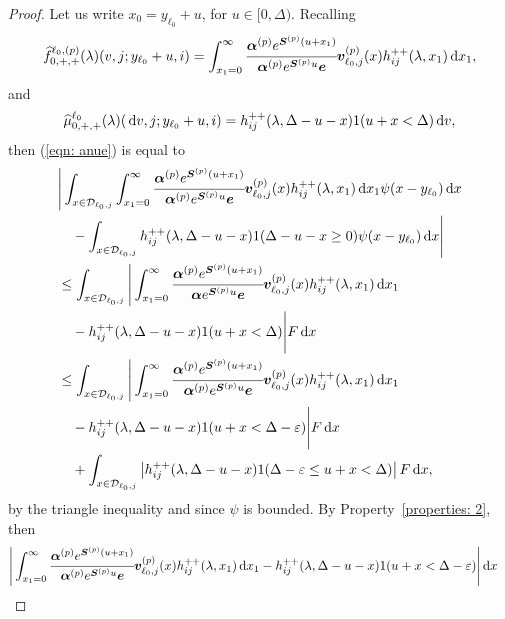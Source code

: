 \begin{proof} 
				Let us write \(x_0=y_{\ell_0}+u\), for \(u\in[0,\Delta)\). Recalling
                \[\widehat f^{\ell_0,(p)}_{0,+,+}(\lambda)(v,j; y_{\ell_0}+u,i) = \int_{x_1=0}^\infty \cfrac{\boldsymbol \alpha^{(p)} e^{\boldsymbol{S}^{(p)}(u+x_1)} }{\boldsymbol \alpha^{(p)} e^{\boldsymbol{S}^{(p)}u} \boldsymbol e} {\boldsymbol v}_{\ell_0,j}^{(p)}(x)h_{ij}^{++}(\lambda,x_1)\, \mathrm{d} x_1,\]
				and 
				\[\widehat \mu^{\ell_0}_{0,+,+}(\lambda)(\, \mathrm{d} v,j; y_{\ell_0}+u,i) = h_{ij}^{++}(\lambda,\Delta-u-x)1(u+x<\Delta)\, \mathrm{d} v,\]
				then (\ref{eqn: anue}) is equal to 
                \begin{align}
                	&\Bigg|\int_{x\in\mathcal{D}_{\ell_0,j}} \int_{x_1=0}^\infty \cfrac{\boldsymbol \alpha^{(p)} e^{\boldsymbol{S}^{(p)}(u+x_1)} }{\boldsymbol \alpha^{(p)} e^{\boldsymbol{S}^{(p)}u} \boldsymbol e} {\boldsymbol v}^{(p)}_{\ell_0,j}(x)h_{ij}^{++} (\lambda,x_1)\, \mathrm{d} x_1 \psi(x-y_{\ell_0})\, \mathrm{d} x  \nonumber 
		\\&\quad{}- \int_{x\in\mathcal{D}_{\ell_0,j}} h_{ij}^{++}(\lambda,\Delta-u-x) 1(\Delta-u-x\geq 0) \psi(x-y_{\ell_0})\, \mathrm{d} x\Bigg| \nonumber 
                	\\&\leq \int_{x\in\mathcal{D}_{\ell_0,j}} \Bigg|  \int_{x_1=0}^\infty \cfrac{\boldsymbol \alpha^{(p)} e^{\boldsymbol{S}^{(p)}(u+x_1)} }{\boldsymbol \alpha e^{\boldsymbol{S}^{(p)}u} \boldsymbol e} {\boldsymbol v}_{\ell_0,j}^{(p)}(x)h_{ij}^{++} (\lambda,x_1)\, \mathrm{d} x_1  \nonumber 
					\\&\quad{}- h_{ij}^{++}(\lambda,\Delta-u-x) 1(u+x<\Delta) \Bigg| F \, \mathrm{d} x\nonumber 
                	\\&\leq \int_{x\in\mathcal{D}_{\ell_0,j}} \Bigg|  \int_{x_1=0}^\infty \cfrac{\boldsymbol \alpha^{(p)} e^{\boldsymbol{S}^{(p)}(u+x_1)} }{\boldsymbol \alpha^{(p)} e^{\boldsymbol{S}^{(p)}u} \boldsymbol e} {\boldsymbol v}^{(p)}_{\ell_0,j}(x)h_{ij}^{++} (\lambda,x_1)\, \mathrm{d} x_1 \nonumber
					\\&\quad{} - h_{ij}^{++}(\lambda,\Delta-u-x) 1(u+x< \Delta - \varepsilon) \Bigg| F \, \mathrm{d} x\nonumber 
                	\\&\quad {}+ \int_{x\in\mathcal{D}_{\ell_0,j}} \left| h_{ij}^{++}(\lambda,\Delta-u-x) 1(\Delta - \varepsilon \leq u+x<\Delta) \right| F \, \mathrm{d} x, \label{eqn: ALllllLsdnn}
                \end{align}
				by the triangle inequality and since \(\psi\) is bounded. 
                By Property~\ref{properties: 2}, then 
				\begin{align}
					& \Bigg|  \int_{x_1=0}^\infty \cfrac{\bs \alpha^{(p)} e^{\bs{S}^{(p)}(u+x_1)} }{\bs \alpha^{(p)} e^{\bs{S}^{(p)}u} \bs e} {\bs v}^{(p)}_{\ell_0,j}(x)h_{ij}^{++} (\lambda,x_1)\wrt x_1 
					- h_{ij}^{++}(\lambda,\Delta-u-x) 1(u+x< \Delta - \varepsilon) \Bigg| \wrt x\nonumber 

\end{align}
\end{proof}
